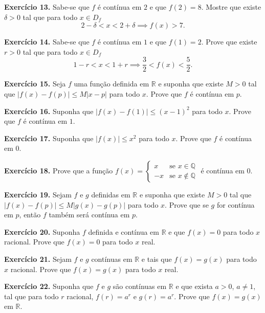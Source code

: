 \documentclass[12pt,a4paper]{article}
\begin{document}
\vspace{0.5cm}
\noindent\textbf{Exercício 13.}
Sabe-se que $f$ é contínua em $2$ e que $f(2) = 8$. Mostre que existe $\delta > 0$ tal que para todo $x \in D_f$
\[
2 - \delta < x < 2 + \delta \implies f(x) > 7.
\]

\vspace{0.5cm}
\noindent\textbf{Exercício 14.}
Sabe-se que $f$ é contínua em $1$ e que $f(1) = 2$. Prove que existe $r > 0$ tal que para todo $x \in D_f$
\[
1 - r < x < 1 + r \implies \dfrac{3}{2} < f(x) < \dfrac{5}{2}.
\]

\vspace{0.5cm}
\noindent\textbf{Exercício 15.}
Seja $f$ uma função definida em $\mathbb{R}$ e suponha que existe $M > 0$ tal que $|f(x) - f(p)| \le M|x - p|$ para todo $x$. Prove que $f$ é contínua em $p$.

\vspace{0.5cm}
\noindent\textbf{Exercício 16.}
Suponha que $|f(x) - f(1)| \le (x - 1)^2$ para todo $x$. Prove que $f$ é contínua em $1$.

\vspace{0.5cm}
\noindent\textbf{Exercício 17.}
Suponha que $|f(x)| \le x^2$ para todo $x$. Prove que $f$ é contínua em $0$.

\vspace{0.5cm}
\noindent\textbf{Exercício 18.}
Prove que a função $f(x) = \begin{cases} x & \text{se } x \in \mathbb{Q} \\ -x & \text{se } x \notin \mathbb{Q} \end{cases}$ é contínua em $0$.

\vspace{0.5cm}
\noindent\textbf{Exercício 19.}
Sejam $f$ e $g$ definidas em $\mathbb{R}$ e suponha que existe $M > 0$ tal que $|f(x) - f(p)| \le M|g(x) - g(p)|$ para todo $x$. Prove que se $g$ for contínua em $p$, então $f$ também será contínua em $p$.

\vspace{0.5cm}
\noindent\textbf{Exercício 20.}
Suponha $f$ definida e contínua em $\mathbb{R}$ e que $f(x) = 0$ para todo $x$ racional. Prove que $f(x) = 0$ para todo $x$ real.

\vspace{0.5cm}
\noindent\textbf{Exercício 21.}
Sejam $f$ e $g$ contínuas em $\mathbb{R}$ e tais que $f(x) = g(x)$ para todo $x$ racional. Prove que $f(x) = g(x)$ para todo $x$ real.

\vspace{0.5cm}
\noindent\textbf{Exercício 22.}
Suponha que $f$ e $g$ são contínuas em $\mathbb{R}$ e que exista $a > 0$, $a \neq 1$, tal que para todo $r$ racional, $f(r) = a^r$ e $g(r) = a^r$. Prove que $f(x) = g(x)$ em $\mathbb{R}$.
\end{document}
